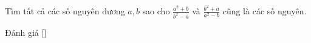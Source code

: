 \ifshowproblem
\begin{problem}\label{problem:IND-2015-TST1-P1}
	Tìm tất cả các số nguyên dương $a, b$ sao cho $\frac{a^2 + b}{b^2 - a}$ và $\frac{b^2 + a}{a^2 - b}$ cũng là các số nguyên.
\end{problem}
\fi

\ifshowinfo
Đánh giá [\textbf{}]\footnotemark
{}
\fi